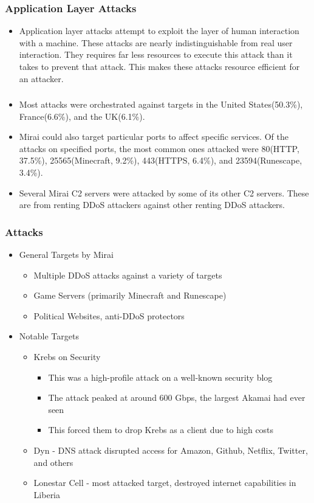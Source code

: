 \documentclass{beamer}
\begin{document}
\begin{frame}
    \frametitle{Application Layer Attacks}
        \begin{itemize}
            \item<+-> Application layer attacks attempt to exploit the layer of human interaction with a machine. These attacks are nearly indistinguishable from real user interaction. They requires far less resources to execute this attack than it takes to prevent that attack. This makes these attacks resource efficient for an attacker.
    \end{itemize}
\end{frame}
\begin{frame}
    \frametitle{}
    \begin{itemize}
        \item<+-> Most attacks were orchestrated against targets in the United States(50.3\%), France(6.6\%), and the UK(6.1\%).
        \item<+-> Mirai could also target particular ports to affect specific services. Of the attacks on specified ports, the most common ones attacked were 80(HTTP, 37.5\%), 25565(Minecraft, 9.2\%), 443(HTTPS, 6.4\%), and 23594(Runescape, 3.4\%).
        \item<+-> Several Mirai C2 servers were attacked by some of its other C2 servers. These are from renting DDoS attackers against other renting DDoS attackers.
    \end{itemize}
\end{frame}

\begin{frame}
    \frametitle{Attacks}
	\begin{itemize}
		\item<+->General Targets by Mirai
			\begin{itemize}
				\item<+-> Multiple DDoS attacks against a variety of targets
				\item<+-> Game Servers (primarily Minecraft and Runescape)
				\item<+-> Political Websites, anti-DDoS protectors
			\end{itemize}
		\item<+-> Notable Targets
			\begin{itemize}
				\item<+-> Krebs on Security
				\begin{itemize}
					\item<+-> This was a high-profile attack on a well-known security blog
					\item<+-> The attack peaked at around 600 Gbps, the largest Akamai had ever seen 						\item<+-> This forced them to drop Krebs as a client due to high costs
				\end{itemize}
				\item<+-> Dyn - DNS attack disrupted access for Amazon, Github, Netflix, Twitter, and others
				\item<+-> Lonestar Cell - most attacked target, destroyed internet capabilities in Liberia
			\end{itemize}
	\end{itemize}
\end{frame}
\end{document}
